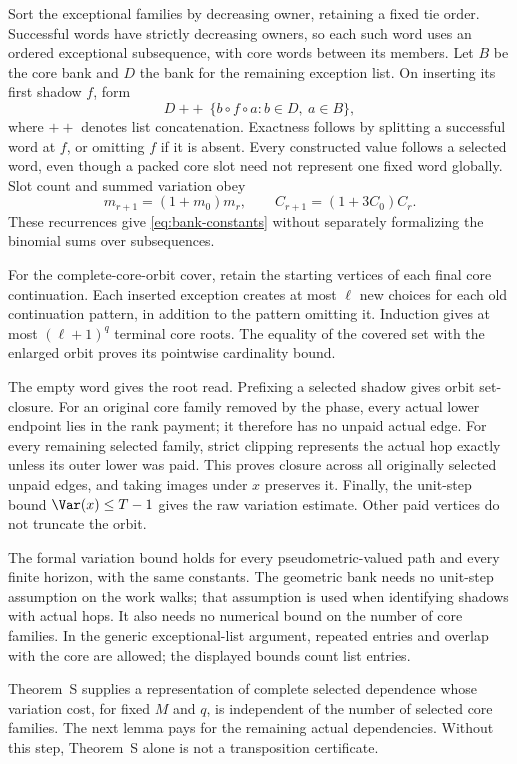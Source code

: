 \begin{outline}
Sort the exceptional families by decreasing owner, retaining a fixed tie
order. Successful words have strictly decreasing owners, so each such word
uses an ordered exceptional subsequence, with core words between its
members. Let $B$ be the core bank and $D$ the bank for the remaining
exception list. On inserting its first shadow $f$, form
\[
 D\ \mathbin{+\!+}\ \{b\circ f\circ a:b\in D,\ a\in B\},
\]
where $+\!+$ denotes list concatenation. Exactness follows by splitting a
successful word at $f$, or omitting $f$ if it is absent. Every constructed
value follows a selected word, even though a packed core slot need not
represent one fixed word globally. Slot count and summed variation obey
\[
 m_{r+1}=(1+m_0)m_r,
 \qquad C_{r+1}=(1+3C_0)C_r.
\]
These recurrences give \eqref{eq:bank-constants} without separately
formalizing the binomial sums over subsequences.

For the complete-core-orbit cover, retain the starting vertices of each
final core continuation. Each inserted exception creates at most $\ell$
new choices for each old continuation pattern, in addition to the pattern
omitting it. Induction gives at most $(\ell+1)^q$ terminal core roots.
The equality of the covered set with the enlarged orbit proves its
pointwise cardinality bound.

The empty word gives the root read. Prefixing a selected shadow gives
orbit set-closure. For an original core family removed by the phase,
every actual lower endpoint lies in the rank payment; it therefore has
no unpaid actual edge. For every remaining selected family, strict
clipping represents the actual hop exactly unless its outer lower was
paid. This proves closure across all originally selected unpaid edges,
and taking images under $x$ preserves it. Finally, the unit-step bound
$\Var(x)\le T-1$ gives the raw variation estimate. Other paid vertices
do not truncate the orbit.
\end{outline}

The formal variation bound holds for every pseudometric-valued path and
every finite horizon, with the same constants. The geometric bank needs
no unit-step assumption on the work walks; that assumption is used when
identifying shadows with actual hops. It also needs no numerical bound
on the number of core families. In the generic exceptional-list argument,
repeated entries and overlap with the core are allowed; the displayed
bounds count list entries.


Theorem~S supplies a representation of complete selected dependence
whose variation cost, for fixed $M$ and $q$, is independent of the number
of selected core families.
The next lemma pays for the remaining actual dependencies. Without this
step, Theorem~S alone is not a transposition certificate.


